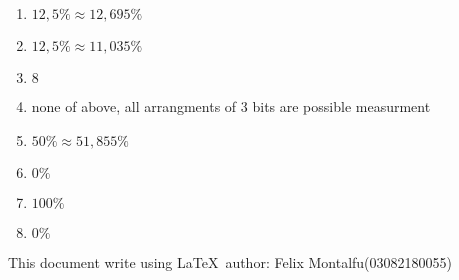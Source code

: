 \documentclass[a4paper]{article}
\begin{document}
    \begin{enumerate}[1.]
        \item $12,5\% \approx 12,695\%$
        \item $12,5\% \approx 11,035\%$
        \item $8$
        \item none of above, all arrangments of 3 bits are possible measurment
        \item $50\% \approx 51,855\%$
        \item $0\%$
        \item $100\%$
        \item $0\%$
    \end{enumerate}
This document write using \LaTeX \ author: Felix Montalfu(03082180055)
\end{document}
